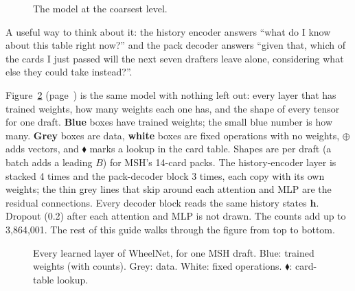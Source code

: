 \documentclass[11pt,letterpaper]{article}
\begin{document}
\begin{figure}[!htbp]
\centering
{}
\caption{The model at the coarsest level.}
\label{fig:big}
\end{figure}

\noindent A useful way to think about it: the history encoder answers ``what do I know about this table
right now?'' and the pack decoder answers ``given that, which of the cards I just passed will the next
seven drafters leave alone, considering what else they could take instead?''.

Figure~\ref{fig:full} (page~\pageref{fig:full}) is the same model with nothing left out: every layer that has
trained weights, how many weights each one has, and the shape of every tensor for one draft. \textbf{Blue}
boxes have trained weights; the small blue number is how many. \textbf{Grey} boxes are data, \textbf{white}
boxes are fixed operations with no weights, $\oplus$ adds vectors, and {\color{corange}$\blacklozenge$} marks a
lookup in the card table. Shapes are per draft (a batch adds a leading $B$) for MSH's 14-card packs. The
history-encoder layer is stacked 4 times and the pack-decoder block 3 times, each copy with its own weights;
the thin grey lines that skip around each attention and MLP are the residual connections. Every decoder block
reads the same history states $\mathbf h$. Dropout (0.2) after each attention and MLP is not drawn. The counts
add up to 3,864,001. The rest of this guide walks through the figure from top to bottom.

\begin{figure}[p]
\centering
\resizebox{!}{0.94\textheight}{}
\caption{Every learned layer of WheelNet, for one MSH draft. Blue: trained weights (with counts). Grey: data.
White: fixed operations. {\color{corange}$\blacklozenge$}: card-table lookup.}
\label{fig:full}
\end{figure}
\end{document}
